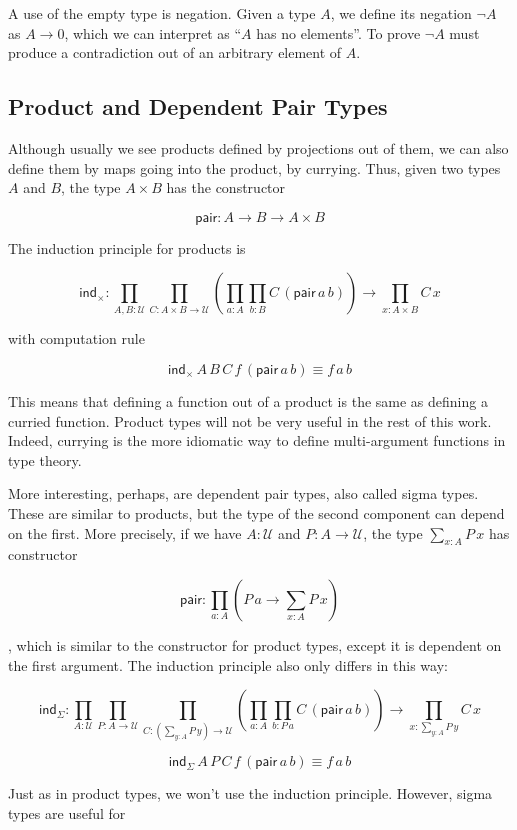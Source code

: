 \documentclass[12 pt]{amsart}
\theoremstyle{definition}
\theoremstyle{remark}
\newcommand{\Type}{\mathcal{U}}
\newcommand{\ind}{\mathsf{ind}}
\newcommand{\no}{\lnot}
\newcommand{\pair}{\mathsf{pair}}
\begin{document}
A use of the empty type is negation. Given a type $A$, we define its negation $\no A$ as $A\to 0$, which we can interpret as ``$A$ has no elements''. To prove $\no A$ must produce a contradiction out of an arbitrary element of $A$.

\subsection{Product and Dependent Pair Types} 
Although usually we see products defined by projections out of them, we can also define them by maps going into the product, by currying. Thus, given two types $A$ and $B$, the type $A\times B$ has the constructor 

\[ \pair : A \to B \to A \times B \]

The induction principle for products is

\[\ind_{\times} : \prod_{A, B : \Type} \prod_{C : A\times B \to \Type} \left(\prod_{a : A} \prod_{b : B} C\, (\pair \, a\, b)\right) \to \prod_{x : A \times B} C\,x\]

with computation rule

\[\ind_{\times}\, A\, B\, C\, f\, (\pair\, a\,b) \equiv f \, a\, b\]

This means that defining a function out of a product is the same as defining a curried function. Product types will not be very useful in the rest of this work. Indeed, currying is the more idiomatic way to define multi-argument functions in type theory. 

More interesting, perhaps, are dependent pair types, also called sigma types. These are similar to products, but the type of the second component can depend on the first. More precisely, if we have $A : \Type$ and $P : A \to \Type$, the type $\sum_{x : A} P\, x$ has constructor

\[ \pair : \prod_{a : A} \left(P\, a \to \sum_{x : A} P\, x\right)\]

, which is similar to the constructor for product types, except it is dependent on the first argument. The induction principle also only differs in this way:

\[\ind_{\Sigma} : \prod_{A : \Type} \prod_{P : A \to \Type} \prod_{C : \left(\sum_{y : A} P\, y\right)\to \Type } \left(\prod_{a : A} \prod_{b : P \, a} C\, (\pair\,a \,b)\right) \to \prod_{x : \sum_{y : A} P\, y} C\, x\]

\[\ind_{\Sigma} \,A\, P \,C \, f\, (\pair \, a \, b) \equiv f\, a \, b\]

Just as in product types, we won't use the induction principle. However, sigma types are useful for
\end{document}
